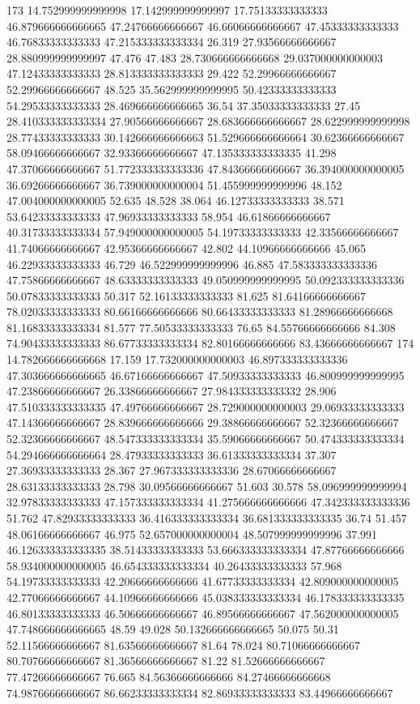 173 14.752999999999998 17.142999999999997 17.75133333333333 46.879666666666665 47.24766666666667 46.66066666666667 47.45333333333333 46.76833333333333 47.215333333333334 26.319 27.93566666666667 28.880999999999997 47.476 47.483 28.730666666666668 29.037000000000003 47.12433333333333 28.813333333333333 29.422 52.29966666666667 52.29966666666667 48.525 35.562999999999995 50.42333333333333 54.29533333333333 28.469666666666665 36.54 37.35033333333333 27.45 28.410333333333334 27.90566666666667 28.683666666666667 28.622999999999998 28.77433333333333 30.142666666666663 51.529666666666664 30.62366666666667 58.09466666666667 32.93366666666667 47.135333333333335 41.298 47.37066666666667 51.772333333333336 47.84366666666667 36.394000000000005 36.69266666666667 36.739000000000004 51.455999999999996 48.152 47.004000000000005 52.635 48.528 38.064 46.12733333333333 38.571 53.64233333333333 47.96933333333333 58.954 46.61866666666667 40.31733333333334 57.949000000000005 54.19733333333333 42.33566666666667 41.74066666666667 42.95366666666667 42.802 44.10966666666666 45.065 46.22933333333333 46.729 46.522999999999996 46.885 47.583333333333336 47.75866666666667 48.63333333333333 49.050999999999995 50.092333333333336 50.07833333333333 50.317 52.16133333333333 81.625 81.64166666666667 78.02033333333333 80.66166666666666 80.66433333333333 81.28966666666668 81.16833333333334 81.577 77.50533333333333 76.65 84.55766666666666 84.308 74.90433333333333 86.67733333333334 82.80166666666666 83.43666666666667
174 14.782666666666668 17.159 17.732000000000003 46.897333333333336 47.303666666666665 46.67166666666667 47.50933333333333 46.800999999999995 47.23866666666667 26.33866666666667 27.984333333333332 28.906 47.510333333333335 47.49766666666667 28.729000000000003 29.06933333333333 47.14366666666667 28.839666666666666 29.38866666666667 52.32366666666667 52.32366666666667 48.547333333333334 35.59066666666667 50.474333333333334 54.294666666666664 28.47933333333333 36.61333333333334 37.307 27.36933333333333 28.367 27.967333333333336 28.67066666666667 28.63133333333333 28.798 30.09566666666667 51.603 30.578 58.096999999999994 32.97833333333333 47.157333333333334 41.275666666666666 47.342333333333336 51.762 47.82933333333333 36.416333333333334 36.681333333333335 36.74 51.457 48.06166666666667 46.975 52.657000000000004 48.507999999999996 37.991 46.126333333333335 38.51433333333333 53.666333333333334 47.87766666666666 58.934000000000005 46.654333333333334 40.26433333333333 57.968 54.19733333333333 42.20666666666666 41.67733333333334 42.809000000000005 42.77066666666667 44.10966666666666 45.038333333333334 46.178333333333335 46.80133333333333 46.50666666666667 46.89566666666667 47.562000000000005 47.748666666666665 48.59 49.028 50.132666666666665 50.075 50.31 52.11566666666667 81.63566666666667 81.64 78.024 80.71066666666667 80.70766666666667 81.36566666666667 81.22 81.52666666666667 77.47266666666667 76.665 84.56366666666666 84.27466666666668 74.98766666666667 86.66233333333334 82.86933333333333 83.44966666666667
